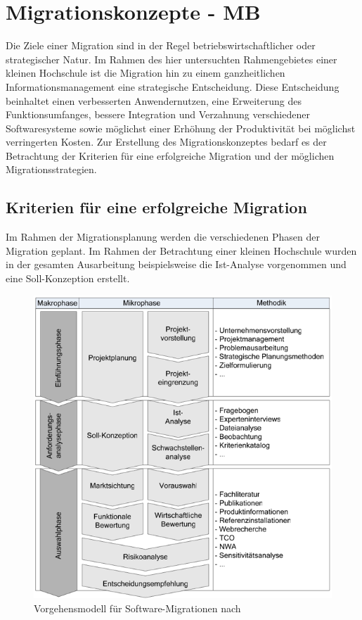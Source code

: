\section{Migrationskonzepte - MB}
\label{section_migrationskonzepte}
Die Ziele einer Migration sind in der Regel betriebswirtschaftlicher oder strategischer Natur. Im Rahmen des hier untersuchten Rahmengebietes einer kleinen Hochschule ist die Migration hin zu einem ganzheitlichen Informationsmanagement eine strategische Entscheidung. Diese Entscheidung beinhaltet einen verbesserten Anwendernutzen, eine Erweiterung des Funktionsumfanges, bessere Integration und Verzahnung verschiedener Softwaresysteme sowie möglichst einer Erhöhung der Produktivität bei möglichst verringerten Kosten. Zur Erstellung des Migrationskonzeptes bedarf es der Betrachtung der Kriterien für eine erfolgreiche Migration und der möglichen Migrationsstrategien.

\subsection{Kriterien für eine erfolgreiche Migration}
Im Rahmen der Migrationsplanung werden die verschiedenen Phasen der Migration geplant. Im Rahmen der Betrachtung einer kleinen Hochschule wurden in der gesamten Ausarbeitung beispielsweise die Ist-Analyse vorgenommen und eine Soll-Konzeption erstellt.

\begin{figure}[h!]
	\centering
	\includegraphics[width=\textwidth]
	{kapitel/gruppe4_1/bilder/vorgehensmodell_softwaremigration}
	\caption{Vorgehensmodell für Software-Migrationen nach \cite{migrationsleitfaden_2012}}
	\label{fig_vorgehensmodell_softwaremigration}	
\end{figure}

